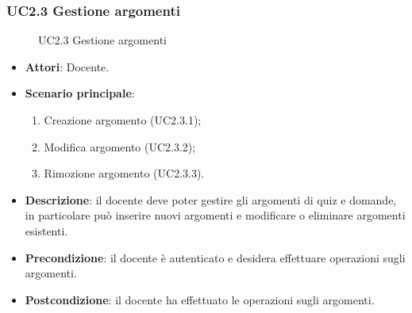 \subsubsection{UC2.3 Gestione argomenti}
\begin{figure}[H]
\centering
\noindent{}
\caption{UC2.3 Gestione argomenti}
\end{figure}
\begin{itemize}
\item \textbf{Attori}: Docente.
\item \textbf{Scenario principale}:
\begin{enumerate}
\item Creazione argomento (UC2.3.1);
\item Modifica argomento (UC2.3.2);
\item Rimozione argomento (UC2.3.3).
\end{enumerate}
\item \textbf{Descrizione}: il docente deve poter gestire gli argomenti di quiz e domande, in particolare può inserire nuovi argomenti e modificare o eliminare argomenti esistenti.
\item \textbf{Precondizione}: il docente è autenticato e desidera effettuare operazioni sugli argomenti.
\item \textbf{Postcondizione}: il docente ha effettuato le operazioni sugli argomenti.
\end{itemize}
